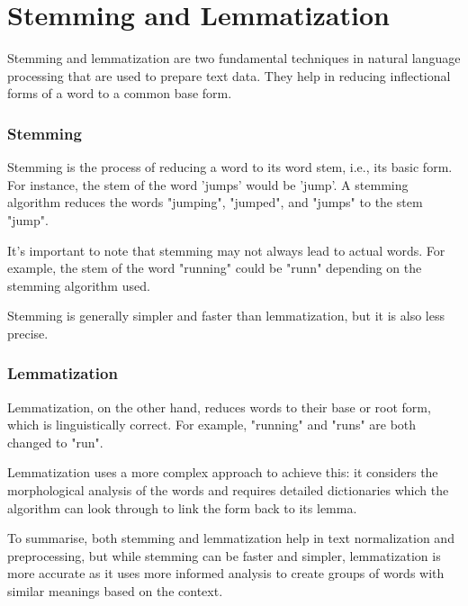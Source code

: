\chapter{Stemming and Lemmatization}

Stemming and lemmatization are two fundamental techniques in natural language processing that are used to prepare text data. They help in reducing inflectional forms of a word to a common base form. 

\subsection{Stemming}

Stemming is the process of reducing a word to its word stem, i.e., its basic form. For instance, the stem of the word 'jumps' would be 'jump'. A stemming algorithm reduces the words "jumping", "jumped", and "jumps" to the stem "jump".

It's important to note that stemming may not always lead to actual words. For example, the stem of the word "running" could be "runn" depending on the stemming algorithm used.

Stemming is generally simpler and faster than lemmatization, but it is also less precise.

\subsection{Lemmatization}

Lemmatization, on the other hand, reduces words to their base or root form, which is linguistically correct. For example, "running" and "runs" are both changed to "run".

Lemmatization uses a more complex approach to achieve this: it considers the morphological analysis of the words and requires detailed dictionaries which the algorithm can look through to link the form back to its lemma.

To summarise, both stemming and lemmatization help in text normalization and preprocessing, but while stemming can be faster and simpler, lemmatization is more accurate as it uses more informed analysis to create groups of words with similar meanings based on the context.
